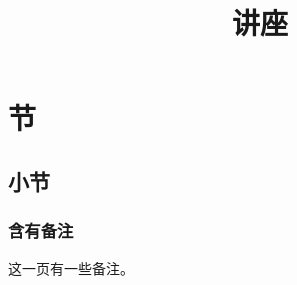 \documentclass{ctexbeamer}
\begin{document}
\title{讲座}
\section{节}
\subsection{小节}
\begin{frame}
  \frametitle{含有备注}
  这一页有一些备注。
\end{frame}
\end{document}
